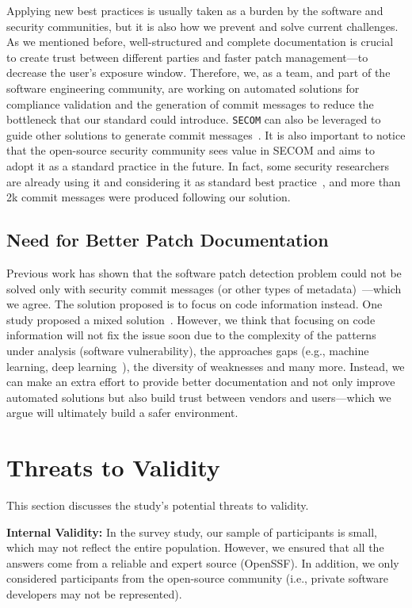 Applying new best practices is usually taken as a burden by the software and security communities, but it is also how we prevent and solve current challenges. As we mentioned before, well-structured and complete documentation is crucial to create trust between different parties and faster patch management---to decrease the user's exposure window. Therefore, we, as a team, and part of the software engineering community, are working on automated solutions for compliance validation and the generation of commit messages to reduce the bottleneck that our standard could introduce. \texttt{SECOM} can also be leveraged to guide other solutions to generate commit messages~\cite{7203049}. It is also important to notice that the open-source security community sees value in SECOM and aims to adopt it as a standard practice in the future. In fact, some security researchers are already using it and considering it as standard best practice~\cite{blackhat}, and more than 2k commit messages were produced following our solution.

\subsection{Need for Better Patch Documentation}

Previous work has shown that the software patch detection problem could not be solved only with security commit messages (or other types of metadata)~\cite{DBLP:journals/corr/abs-1806-05893,9678720}---which we agree. The solution proposed is to focus on code information instead. One study proposed a mixed solution~\cite{SSPatcher2022}. However, we think that focusing on code information will not fix the issue soon due to the complexity of the patterns under analysis (software vulnerability), the approaches gaps (e.g., machine learning, deep learning~\cite{9448435}), the diversity of weaknesses and many more. Instead, we can make an extra effort to provide better documentation and not only improve automated solutions but also build trust between vendors and users---which we argue will ultimately build a safer environment.


\section{Threats to Validity}\label{sec:t2v}

This section discusses the study's potential threats to validity.

\textbf{Internal Validity:}  In the survey study, our sample of participants is small, which may not reflect the entire population. However, we ensured that all the answers come from a reliable and expert source (OpenSSF). In addition, we only considered participants from the open-source community (i.e., private software developers may not be represented).

